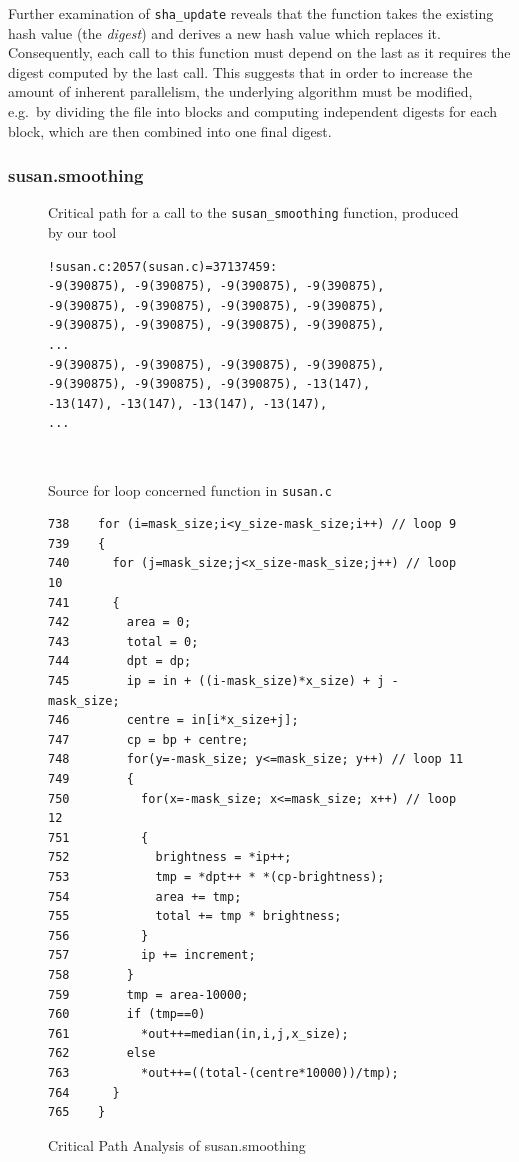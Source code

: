 Further examination of \texttt{sha\_update} reveals that the function takes the existing hash value (the \emph{digest}) and derives a new hash value which replaces it.
Consequently, each call to this function must depend on the last as it requires the digest computed by the last call.
This suggests that in order to increase the amount of inherent parallelism, the underlying algorithm must be modified, e.g.\ by dividing the file into blocks and computing independent digests for each block, which are then combined into one final digest.

\subsubsection{\textsf{susan.smoothing}}

\begin{figure}
  \begin{center}
    \scriptsize
    \begin{SubFloat}{\label{susan-bottleneck:critpath}Critical path for a call to the \texttt{susan\_smoothing} function, produced by our tool}
      \begin{minipage}{3in}
        \begin{verbatim}
!susan.c:2057(susan.c)=37137459:
-9(390875), -9(390875), -9(390875), -9(390875),
-9(390875), -9(390875), -9(390875), -9(390875),
-9(390875), -9(390875), -9(390875), -9(390875),
...
-9(390875), -9(390875), -9(390875), -9(390875),
-9(390875), -9(390875), -9(390875), -13(147),
-13(147), -13(147), -13(147), -13(147), 
...
        \end{verbatim}
      \end{minipage}
    \end{SubFloat}
\\
    \begin{SubFloat}{\label{susan-bottleneck:source}Source for loop concerned function in \texttt{susan.c}}
      \begin{minipage}{3in}
        \begin{verbatim}
738    for (i=mask_size;i<y_size-mask_size;i++) // loop 9
739    {
740      for (j=mask_size;j<x_size-mask_size;j++) // loop 10
741      {
742        area = 0;
743        total = 0;
744        dpt = dp;
745        ip = in + ((i-mask_size)*x_size) + j - mask_size;
746        centre = in[i*x_size+j];
747        cp = bp + centre;
748        for(y=-mask_size; y<=mask_size; y++) // loop 11
749        {
750          for(x=-mask_size; x<=mask_size; x++) // loop 12
751          {
752            brightness = *ip++;
753            tmp = *dpt++ * *(cp-brightness);
754            area += tmp;
755            total += tmp * brightness;
756          }
757          ip += increment;
758        }
759        tmp = area-10000;
760        if (tmp==0)
761          *out++=median(in,i,j,x_size);
762        else
763          *out++=((total-(centre*10000))/tmp);
764      }
765    }
        \end{verbatim}
      \end{minipage}
    \end{SubFloat}
  \end{center}
  \caption{Critical Path Analysis of \textsf{susan.smoothing}}
  \label{susan-bottleneck}
\end{figure}

